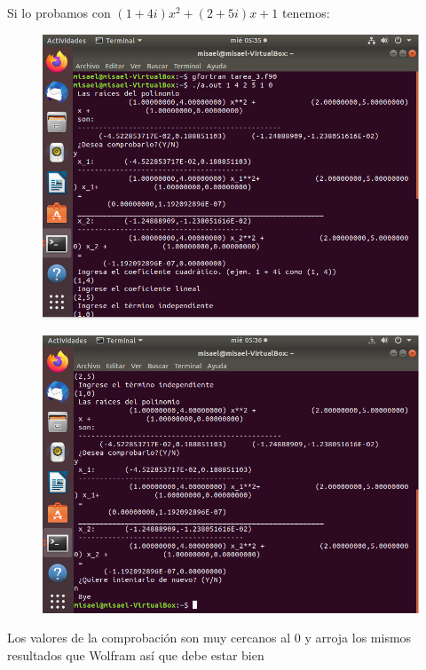 \documentclass[12pt,a4paper]{article}
\begin{document}
\newpage

Si lo probamos con $(1+4i)x^2+(2+5i)x+1$ tenemos:

\begin{figure}[h!]
    \includegraphics[scale = 0.7]{1.PNG}

\end{figure}

\begin{figure}[h!]
    \includegraphics[scale = 0.7]{2.PNG}

\end{figure}



Los valores de la comprobación son muy cercanos al 0 y  arroja los mismos resultados que Wolfram así que debe estar bien
\end{document}

